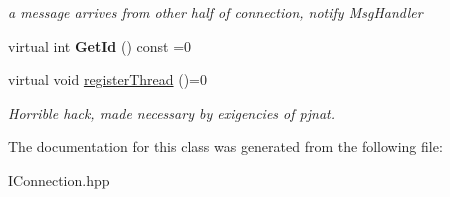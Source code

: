 \begin{DoxyCompactItemize}
\begin{DoxyCompactList}\small\item\em a message arrives from other half of connection, notify MsgHandler \item\end{DoxyCompactList}\item 
\hypertarget{classPseudoTcp_1_1IConnection_adb019cbaaa9ac27a98764a7085a67e3f}{
virtual int {\bfseries GetId} () const =0}
\label{classPseudoTcp_1_1IConnection_adb019cbaaa9ac27a98764a7085a67e3f}

\item 
\hypertarget{classPseudoTcp_1_1IConnection_a5166f14753cd7cc5ca8e20e701812f0c}{
virtual void \hyperlink{classPseudoTcp_1_1IConnection_a5166f14753cd7cc5ca8e20e701812f0c}{registerThread} ()=0}
\label{classPseudoTcp_1_1IConnection_a5166f14753cd7cc5ca8e20e701812f0c}

\begin{DoxyCompactList}\small\item\em Horrible hack, made necessary by exigencies of pjnat. \item\end{DoxyCompactList}\end{DoxyCompactItemize}


The documentation for this class was generated from the following file:\begin{DoxyCompactItemize}
\item 
IConnection.hpp\end{DoxyCompactItemize}
